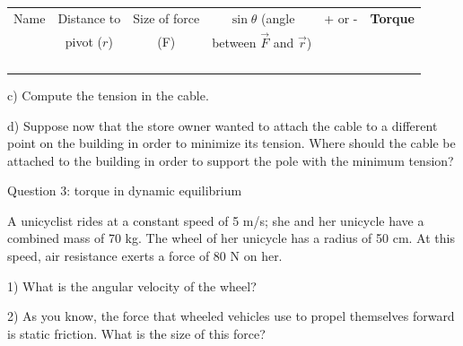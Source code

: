 \documentclass[12pt]{article}
\begin{document}
\Large
\begin{center}
\begin{tabular}{|c|c|c|c|c|c|}
\hline
Name & Distance to & Size of force & $\sin \theta$ (angle  & + or - & {\bf Torque} \\
     & pivot ($r$) & (F) & between $\vec F$ and $\vec r$) & & \\\hline
   
              &                         &                        &                                              &                    &                               \\ \hline
              &                         &                        &                                              &                    &                               \\ \hline
              &                         &                        &                                              &                    &                               \\ \hline
              &                         &                        &                                              &                    &                               \\ \hline
\end{tabular}
\end{center}
\normalsize
c) Compute the tension in the cable.

\vspace{3 in}

d) Suppose now that the store owner wanted to attach the cable to a different point on the building in order to minimize its tension. Where should the cable be attached to the building in order to support the pole with the minimum tension?


\newpage

\centerline{\large Question 3: torque in dynamic equilibrium}

A unicyclist rides at a constant speed of 5 m/s; she and her unicycle have a combined mass of 70 kg. The wheel of her unicycle has a radius of 50 cm. At this speed, air resistance exerts a force of 80 N on her.


1) What is the angular velocity of the wheel?
\vspace{1.2in}

2) As you know, the force that wheeled vehicles use to propel themselves forward is static friction. What is the size of this force?
\vspace {1.2in}
\end{document}
